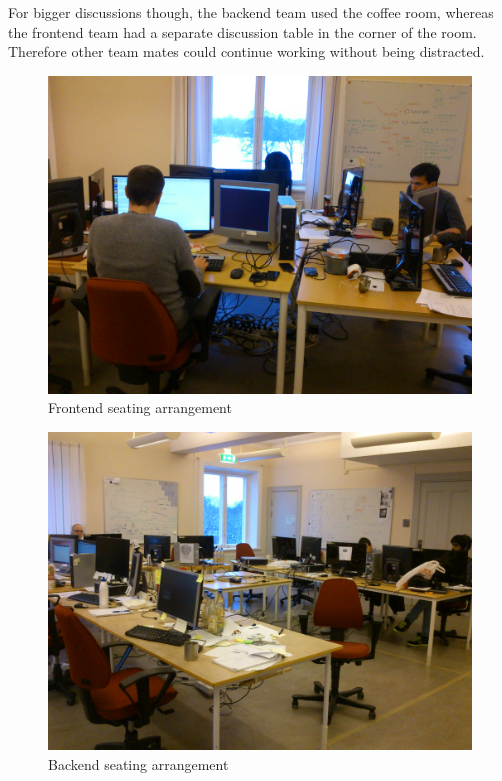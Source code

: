 For bigger discussions though, the backend team used the coffee room, whereas the
frontend team had a separate discussion table in the corner of the room. Therefore
other team mates could continue working without being distracted.

\begin{figure}
\centering
\includegraphics[scale=0.1]{graphics/frontend_seating}
\caption{Frontend seating arrangement}\label{fig:frontend_seating}
\end{figure}


\begin{figure}
\centering
\includegraphics[scale=0.1]{graphics/backend_seating}
\caption{Backend seating arrangement}\label{fig:backend_seating}
\end{figure}
